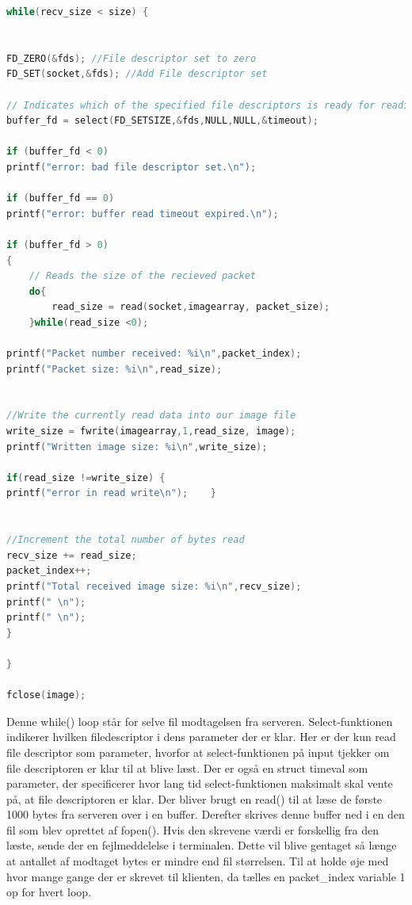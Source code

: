 \documentclass[12pt,fleqn,a4paper]{report}
\begin{document}
\begin{framed}
\begin{lstlisting}[language=C++]
while(recv_size < size) {
	
	
FD_ZERO(&fds); //File descriptor set to zero
FD_SET(socket,&fds); //Add File descriptor set
	
// Indicates which of the specified file descriptors is ready for reading, writing, or has an error condition pending
buffer_fd = select(FD_SETSIZE,&fds,NULL,NULL,&timeout);
	
if (buffer_fd < 0)
printf("error: bad file descriptor set.\n");
	
if (buffer_fd == 0)
printf("error: buffer read timeout expired.\n");
	
if (buffer_fd > 0)
{
	// Reads the size of the recieved packet
	do{
		read_size = read(socket,imagearray, packet_size);
	}while(read_size <0);
	
printf("Packet number received: %i\n",packet_index);
printf("Packet size: %i\n",read_size);
	
	
//Write the currently read data into our image file
write_size = fwrite(imagearray,1,read_size, image);
printf("Written image size: %i\n",write_size);

if(read_size !=write_size) {
printf("error in read write\n");    }
	
	
//Increment the total number of bytes read
recv_size += read_size;
packet_index++;
printf("Total received image size: %i\n",recv_size);
printf(" \n");
printf(" \n");
}

}

fclose(image);
\end{lstlisting}
\end{framed}

Denne while() loop står for selve fil modtagelsen fra serveren. Select-funktionen indikerer hvilken filedescriptor i dens parameter der er klar. Her er der kun read file descriptor som parameter, hvorfor at select-funktionen på input tjekker om file descriptoren er klar til at blive læst. 
Der er også en struct timeval som parameter, der specificerer hvor lang tid select-funktionen maksimalt skal vente på, at file descriptoren er klar.
Der bliver brugt en read() til at læse de første 1000 bytes fra serveren over i en buffer. Derefter skrives denne buffer ned i en den fil som blev oprettet af fopen(). Hvis den skrevene værdi er forskellig fra den læste, sende der en fejlmeddelelse i terminalen. Dette vil blive gentaget så længe at antallet af modtaget bytes er mindre end fil størrelsen.
Til at holde øje med hvor mange gange der er skrevet til klienten, da tælles en packet\_index variable 1 op for hvert loop.
\end{document}
